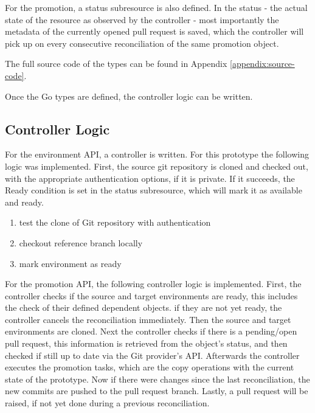

For the promotion,
a status subresource is also defined.
In the status - the actual state of the resource as observed by the controller -
most importantly the metadata of the currently opened pull request is saved,
which the controller will pick up on every consecutive reconciliation
of the same promotion object.



The full source code of the types can be found in Appendix
\ref{appendix:source-code}.

Once the Go types are defined,
the controller logic can be written.

\subsection{Controller Logic}

For the environment API,
a controller is written.
For this prototype the following logic was implemented.
First, the source git repository is cloned and checked out,
with the appropriate authentication options, if it is private.
If it succeeds, the Ready condition is set in the status subresource,
which will mark it as available and ready.

\begin{enumerate}
	\item test the clone of Git repository with authentication
	\item checkout reference branch locally
	\item mark environment as ready
\end{enumerate}

For the promotion API,
the following controller logic is implemented.
First, the controller checks if the source and target environments are ready,
this includes the check of their defined dependent objects.
if they are not yet ready, the controller cancels the reconciliation immediately.
Then the source and target environments are cloned.
Next the controller checks if there is a pending/open pull request,
this information is retrieved from the object's status, and then checked
if still up to date via the Git provider's API.
Afterwards the controller executes the promotion tasks,
which are the copy operations with the current state of the prototype.
Now if there were changes since the last reconciliation, the new commits
are pushed to the pull request branch.
Lastly, a pull request will be raised, if not yet done during a previous reconciliation.

